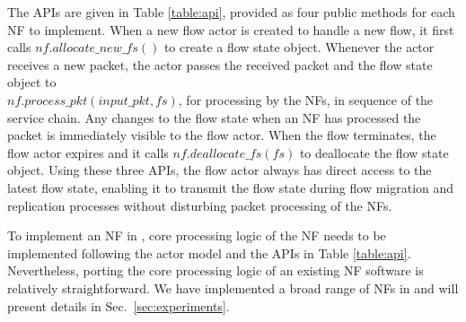 The APIs are given in Table \ref{table:api}, provided as four public methods for each NF to implement. When a new flow actor is created to handle a new flow, it first calls $nf.allocate\_new\_fs()$ to create a flow state object. Whenever the actor receives a new packet, the actor passes the received packet and the flow state object to \\
$nf.process\_pkt(input\_pkt, fs)$, for processing by the NFs, in sequence of the service chain. Any changes to the flow state when an NF has processed the packet is immediately visible to the flow actor. When the flow terminates, the flow actor expires and it calls $nf.deallocate\_fs(fs)$ to deallocate the flow state object. Using these three APIs, the flow actor always has direct access to the latest flow state, enabling it to transmit the flow state during flow migration and replication processes without disturbing packet processing of the NFs. %





To implement an NF in \nfactor, core processing logic of the NF needs to be implemented following the actor model and the APIs in Table \ref{table:api}. Nevertheless, porting the core
processing logic of an existing NF software is relatively straightforward. We have implemented a broad range of NFs in \nfactor and will present details in Sec.~\ref{sec:experiments}.


